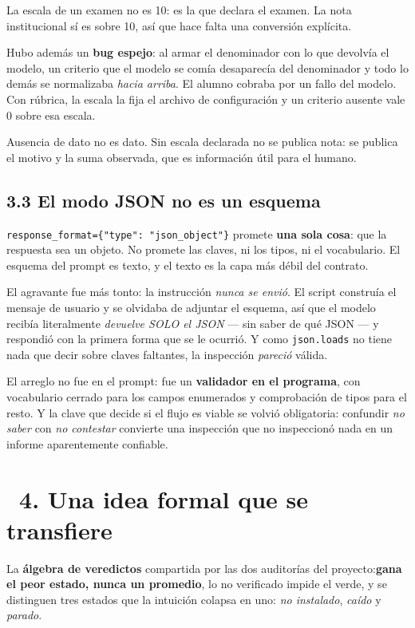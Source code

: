 \documentclass[11pt,a4paper]{article}
\newcommand{\iconotexto}[2]{\textcolor{cyanNeon}{\faIcon{#1}}~#2}
\begin{document}
La escala de un examen no es 10: es la que declara el examen. La nota
institucional sí es sobre 10, así que hace falta una conversión explícita.

Hubo además un \textbf{bug espejo}: al armar el denominador con lo que
devolvía el modelo, un criterio que el modelo se comía desaparecía del
denominador y todo lo demás se normalizaba \emph{hacia arriba}. El alumno
cobraba por un fallo del modelo. Con rúbrica, la escala la fija el archivo de
configuración y un criterio ausente vale 0 sobre esa escala.

\begin{cajaConcepto}
Ausencia de dato no es dato. Sin escala declarada no se publica nota: se publica
el motivo y la suma observada, que es información útil para el humano.
\end{cajaConcepto}

\subsection*{3.3 El modo JSON no es un esquema}
\texttt{response\_format=\{"type": "json\_object"\}} promete \textbf{una sola
cosa}: que la respuesta sea un objeto. No promete las claves, ni los tipos, ni
el vocabulario. El esquema del prompt es texto, y el texto es la capa más débil
del contrato.

El agravante fue más tonto: la instrucción \emph{nunca se envió}. El script
construía el mensaje de usuario y se olvidaba de adjuntar el esquema, así que el
modelo recibía literalmente \emph{devuelve SOLO el JSON} --- sin saber de qué
JSON --- y respondió con la primera forma que se le ocurrió. Y como
\texttt{json.loads} no tiene nada que decir sobre claves faltantes, la
inspección \emph{pareció} válida.

\begin{cajaEjemplo}
El arreglo no fue en el prompt: fue un \textbf{validador en el programa}, con
vocabulario cerrado para los campos enumerados y comprobación de tipos para el
resto. Y la clave que decide si el flujo es viable se volvió obligatoria:
confundir \emph{no saber} con \emph{no contestar} convierte una inspección
que no inspeccionó nada en un informe aparentemente confiable.
\end{cajaEjemplo}

\section{\iconotexto{balance-scale}{4. Una idea formal que se transfiere}}
La \textbf{álgebra de veredictos} compartida por las dos auditorías del
proyecto:\textbf{gana el peor estado, nunca un promedio}, lo no verificado
impide el verde, y se distinguen tres estados que la intuición colapsa en uno:
\emph{no instalado}, \emph{caído} y \emph{parado}.
\end{document}
